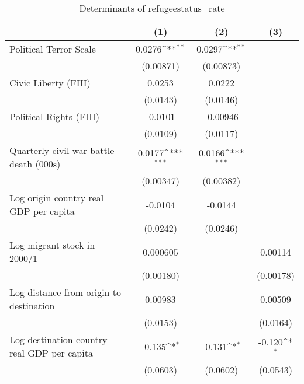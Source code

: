 \begin{table}[htbp]\centering
\def\sym#1{\ifmmode^{#1}\else\(^{#1}\)\fi}
\caption{Determinants of refugeestatus\_rate}
\begin{tabular}{l*{3}{c}}
\hline\hline
                    &\multicolumn{1}{c}{(1)}         &\multicolumn{1}{c}{(2)}         &\multicolumn{1}{c}{(3)}         \\
\hline
Political Terror Scale&      0.0276\sym{**} &      0.0297\sym{**} &                     \\
                    &   (0.00871)         &   (0.00873)         &                     \\
[1em]
Civic Liberty (FHI) &      0.0253         &      0.0222         &                     \\
                    &    (0.0143)         &    (0.0146)         &                     \\
[1em]
Political Rights (FHI)&     -0.0101         &    -0.00946         &                     \\
                    &    (0.0109)         &    (0.0117)         &                     \\
[1em]
Quarterly civil war battle death (000s)&      0.0177\sym{***}&      0.0166\sym{***}&                     \\
                    &   (0.00347)         &   (0.00382)         &                     \\
[1em]
Log origin country real GDP per capita&     -0.0104         &     -0.0144         &                     \\
                    &    (0.0242)         &    (0.0246)         &                     \\
[1em]
Log migrant stock in 2000/1&    0.000605         &                     &     0.00114         \\
                    &   (0.00180)         &                     &   (0.00178)         \\
[1em]
Log distance from origin to destination&     0.00983         &                     &     0.00509         \\
                    &    (0.0153)         &                     &    (0.0164)         \\
[1em]
Log destination country real GDP per capita&      -0.135\sym{*}  &      -0.131\sym{*}  &      -0.120\sym{*}  \\
                    &    (0.0603)         &    (0.0602)         &    (0.0543)         \\

\end{tabular}
\end{table}
